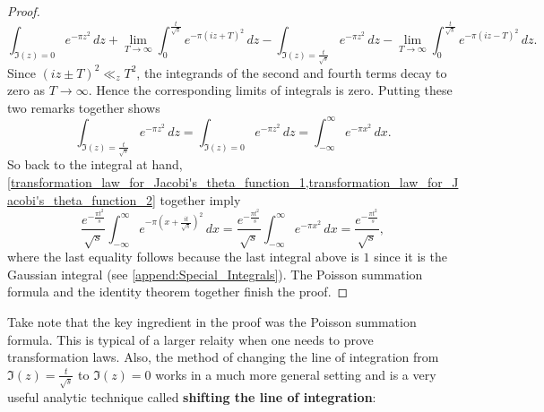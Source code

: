 \begin{proof}
        \[
          \int_{\Im(z) = 0}e^{-\pi z^{2}}\,dz+\lim_{T \to \infty}\int_{0}^{\frac{t}{\sqrt{s}}}e^{-\pi(iz+T)^{2}}\,dz-\int_{\Im(z) = \frac{t}{\sqrt{s}}}e^{-\pi z^{2}}\,dz-\lim_{T \to \infty}\int_{0}^{\frac{t}{\sqrt{s}}}e^{-\pi(iz-T)^{2}}\,dz.
        \]
        Since $(iz \pm T)^{2} \ll_{z} T^{2}$, the integrands of the second and fourth terms decay to zero as $T \to \infty$. Hence the corresponding limits of integrals is zero. Putting these two remarks together shows
        \begin{equation}\label{transformation_law_for_Jacobi's_theta_function_2}
          \int_{\Im(z) = \frac{t}{\sqrt{s}}}e^{-\pi z^{2}}\,dz = \int_{\Im(z) = 0}e^{-\pi z^{2}}\,dz = \int_{-\infty}^{\infty}e^{-\pi x^{2}}\,dx.
        \end{equation}
        So back to the integral at hand, \cref{transformation_law_for_Jacobi's_theta_function_1,transformation_law_for_Jacobi's_theta_function_2} together imply
        \[
          \frac{e^{-\frac{\pi t^{2}}{s}}}{\sqrt{s}}\int_{-\infty}^{\infty}e^{-\pi\left(x+\frac{it}{\sqrt{s}}\right)^{2}}\,dx = \frac{e^{-\frac{\pi t^{2}}{s}}}{\sqrt{s}}\int_{-\infty}^{\infty}e^{-\pi x^{2}}\,dx = \frac{e^{-\frac{\pi t^{2}}{s}}}{\sqrt{s}},
        \]
        where the last equality follows because the last integral above is $1$ since it is the Gaussian integral (see \cref{append:Special_Integrals}). The Poisson summation formula and the identity theorem together finish the proof.
      \end{proof}

      Take note that the key ingredient in the proof was the Poisson summation formula. This is typical of a larger relaity when one needs to prove transformation laws. Also, the method of changing the line of integration from $\Im(z) = \frac{t}{\sqrt{s}}$ to $\Im(z) = 0$ works in a much more general setting and is a very useful analytic technique called \textbf{shifting the line of integration}:

